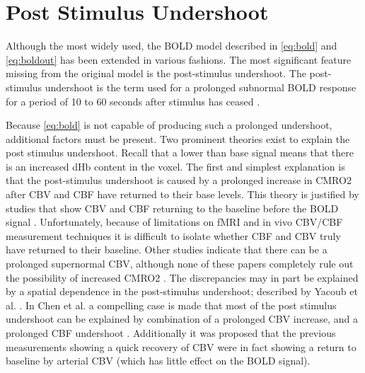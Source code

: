 \section{Post Stimulus Undershoot}
\label{sec:Post Stimulus Undershoot}
Although the most widely used, the \ac{BOLD} model described in \autoref{eq:bold}
and \autoref{eq:boldout} has been extended in various fashions. The most
significant feature missing from the original model is the 
post-stimulus undershoot.
The post-stimulus undershoot is the term used for a prolonged subnormal
\ac{BOLD} response for a period of 10 to 60 seconds after stimulus has
ceased \cite{Chen2009,Mandeville1999a}.

Because \autoref{eq:bold} is not capable of producing such a prolonged undershoot,
additional factors must be present. Two prominent theories exist to explain the post 
stimulus undershoot.  Recall
that a lower than base signal means that there is an increased \ac{dHb}
content in the voxel. The first and simplest explanation is that the post-stimulus
undershoot is caused by a prolonged increase in \ac{CMRO2} after \ac{CBV} and \ac{CBF}
have returned to their base levels. This theory is justified by 
studies that show \ac{CBV} and \ac{CBF} returning to the baseline before the \ac{BOLD} signal
\cite{Frahm2008, Donahue2009, Buxton2004, Lu2004, Shen2008}. 
Unfortunately, because of limitations on \ac{fMRI} and in vivo
\ac{CBV}/\ac{CBF} measurement techniques it is difficult to isolate whether \ac{CBF} and
\ac{CBV} truly have returned to their baseline. Other studies indicate
that there can be a prolonged supernormal \ac{CBV}, although none of these papers completely
rule out the possibility of increased \ac{CMRO2}  \cite{Mandeville1999a,
Behzadi2005, Chen2009}. The discrepancies may in part
be explained by a spatial dependence in the post-stimulus undershoot; described
by Yacoub et al. \cite{Yacoub2006}. In Chen et al. 
a compelling case is made that most of the post stimulus undershoot can be 
explained by combination of a prolonged \ac{CBV} increase, and a prolonged \ac{CBF} 
undershoot \cite{Chen2009}. Additionally it was proposed that
the previous measurements showing a quick recovery of \ac{CBV} 
were in fact showing a return to baseline by arterial \ac{CBV} (which
has little effect on the \ac{BOLD} signal).

